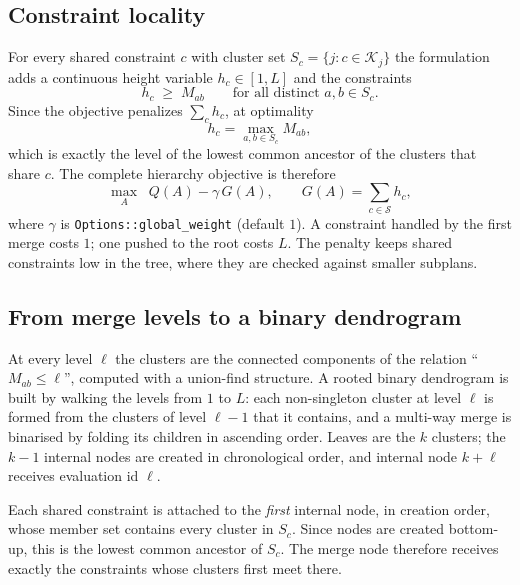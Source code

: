 \documentclass[11pt,a4paper]{article}
\newcommand{\cK}{\mathcal{K}}
\newcommand{\cS}{\mathcal{S}}
\begin{document}
\subsection{Constraint locality}
For every shared constraint $c$ with cluster set
$S_c=\{j:c\in\cK_j\}$ the formulation adds a continuous height variable
$h_c\in[1,L]$ and the constraints
\begin{equation}
h_c\;\ge\;M_{ab}\qquad\text{for all distinct }a,b\in S_c.
\end{equation}
Since the objective penalizes $\sum_c h_c$, at optimality
\begin{equation}
h_c=\max_{a,b\in S_c}M_{ab},
\end{equation}
which is exactly the level of the lowest common ancestor of the clusters that
share $c$. The complete hierarchy objective is therefore
\begin{equation}
\max_{A}\;\;Q(A)-\gamma\,G(A),
\qquad
G(A)=\sum_{c\in\cS}h_c,
\label{eq:hierarchy-objective}
\end{equation}
where $\gamma$ is \texttt{Options::global\_weight} (default $1$). A constraint
handled by the first merge costs $1$; one pushed to the root costs $L$. The
penalty keeps shared constraints low in the tree, where they are checked
against smaller subplans.

\subsection{From merge levels to a binary dendrogram}
At every level $\ell$ the clusters are the connected components of the relation
``$M_{ab}\le\ell$'', computed with a union-find structure. A rooted binary
dendrogram is built by walking the levels from $1$ to $L$: each non-singleton
cluster at level $\ell$ is formed from the clusters of level $\ell-1$ that it
contains, and a multi-way merge is binarised by folding its children in
ascending order. Leaves are the $k$ clusters; the $k-1$ internal nodes are
created in chronological order, and internal node $k+\ell$ receives evaluation
id $\ell$.

Each shared constraint is attached to the \emph{first} internal node, in
creation order, whose member set contains every cluster in $S_c$. Since nodes
are created bottom-up, this is the lowest common ancestor of $S_c$. The merge
node therefore receives exactly the constraints whose clusters first meet
there.
\end{document}
